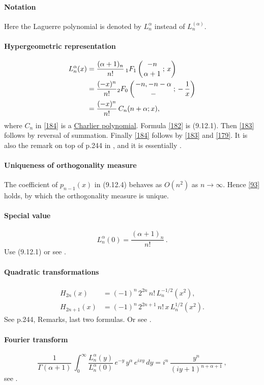 \documentclass[envcountchap,graybox]{svmono}
\newcommand{\hyp}[5]{\mbox{}_{#1}{F}_{#2}
\left(\genfrac{}{}{0pt}{}{#3}{#4}\,;\,#5\right)}
\renewcommand{\Gamma}{\varGamma}
\newcommand\al\alpha
\newcommand\Ga{\Gamma}
\newcommand\iy\infty
\begin{document}
\paragraph{Notation}
Here the Laguerre polynomial is denoted by $L_n^\al$ instead of
$L_n^{(\al)}$.
%
\paragraph{Hypergeometric representation}
\begin{align}
L_n^\al(x)&=
\frac{(\al+1)_n}{n!}\,\hyp11{-n}{\al+1}x
\label{182}\\
&=\frac{(-x)^n}{n!} \hyp20{-n,-n-\al}-{-\,\frac1x}
\label{183}\\
&=\frac{(-x)^n}{n!}\,C_n(n+\al;x),
\label{184}
\end{align}
where $C_n$ in \eqref{184} is a
\hyperref[sec9.14]{Charlier polynomial}.
Formula \eqref{182} is (9.12.1). Then \eqref{183} follows by reversal
of summation. Finally \eqref{184} follows by \eqref{183} and \eqref{179}.
It is also the remark on top of p.244 in , and it is essentially
.
%
\paragraph{Uniqueness of orthogonality measure}
The coefficient of $p_{n-1}(x)$ in (9.12.4) behaves as $O(n^2)$ as $n\to\iy$.
Hence \eqref{93} holds, by which the orthogonality measure is unique.
%
\paragraph{Special value}
\begin{equation}
L_n^{\al}(0)=\frac{(\al+1)_n}{n!}\,.
\label{53}
\end{equation}
Use (9.12.1) or see .
%
\paragraph{Quadratic transformations}
\begin{align}
H_{2n}(x)&=(-1)^n\,2^{2n}\,n!\,L_n^{-1/2}(x^2),
\label{54}\\
H_{2n+1}(x)&=(-1)^n\,2^{2n+1}\,n!\,x\,L_n^{1/2}(x^2).
\label{55}
\end{align}
See p.244, Remarks, last two formulas.
Or see .
%
\paragraph{Fourier transform}
\begin{equation}
\frac1{\Ga(\al+1)}\,\int_0^\iy \frac{L_n^\al(y)}{L_n^\al(0)}\,
e^{-y}\,y^\al\,e^{ixy}\,dy=
i^n\,\frac{y^n}{(iy+1)^{n+\al+1}}\,,
\label{14}
\end{equation}
see .
%
\end{document}
